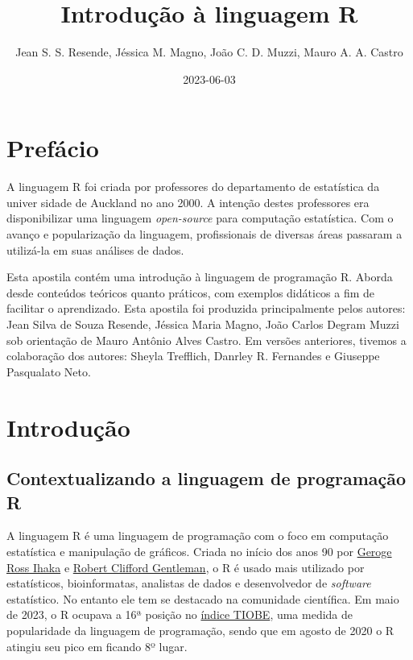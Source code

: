 \documentclass[
]{book}
\title{Introdução à linguagem R}
\author{Jean S. S. Resende, Jéssica M. Magno, João C. D. Muzzi, Mauro A. A. Castro}
\date{2023-06-03}
\theoremstyle{definition}
\theoremstyle{definition}
\theoremstyle{definition}
\theoremstyle{definition}
\theoremstyle{remark}
\begin{document}
\maketitle

{
\setcounter{tocdepth}{1}
\tableofcontents
}
\hypertarget{prefuxe1cio}{%
\chapter{Prefácio}\label{prefuxe1cio}}

A linguagem R foi criada por professores do departamento de estatística da univer sidade de Auckland no ano 2000. A intenção destes professores era disponibilizar uma linguagem \emph{open-source} para computação estatística. Com o avanço e popularização da linguagem, profissionais de diversas áreas passaram a utilizá-la em suas análises de dados.

Esta apostila contém uma introdução à linguagem de programação R. Aborda desde conteúdos teóricos quanto práticos, com exemplos didáticos a fim de facilitar o aprendizado. Esta apostila foi produzida principalmente pelos autores: Jean Silva de Souza Resende, Jéssica Maria Magno, João Carlos Degram Muzzi sob orientação de Mauro Antônio Alves Castro. Em versões anteriores, tivemos a colaboração dos autores: Sheyla Trefflich, Danrley R. Fernandes e Giuseppe Pasqualato Neto.

\hypertarget{introduuxe7uxe3o}{%
\chapter{Introdução}\label{introduuxe7uxe3o}}

\hypertarget{contextualizando-a-linguagem-de-programauxe7uxe3o-r}{%
\section{Contextualizando a linguagem de programação R}\label{contextualizando-a-linguagem-de-programauxe7uxe3o-r}}

A linguagem R é uma linguagem de programação com o foco em computação estatística e manipulação de gráficos. Criada no início dos anos 90 por \href{https://en.wikipedia.org/wiki/Ross_Ihaka}{Geroge Ross Ihaka} e \href{https://en.wikipedia.org/wiki/Robert_Gentleman_(statistician)}{Robert Clifford Gentleman}, o R é usado mais utilizado por estatísticos, bioinformatas, analistas de dados e desenvolvedor de \emph{software} estatístico. No entanto ele tem se destacado na comunidade científica. Em maio de 2023, o R ocupava a 16ª posição no \href{https://www.tiobe.com/tiobe-index/}{índice TIOBE}, uma medida de popularidade da linguagem de programação, sendo que em agosto de 2020 o R atingiu seu pico em ficando 8º lugar.
\end{document}
